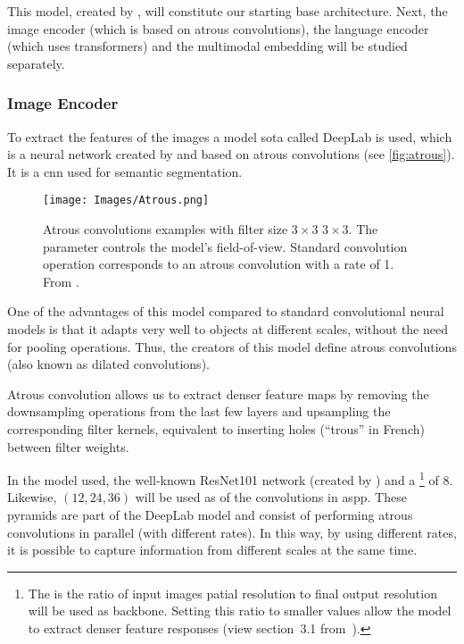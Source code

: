 This model, created by , will constitute our starting
base architecture. Next, the image encoder (which is based on atrous
convolutions), the language encoder (which uses transformers) and the
multimodal embedding will be studied separately.

\subsubsection{Image Encoder}
To extract the features of the images a model \gls{sota} called DeepLab is
used, which is a neural network created by  and based on
atrous convolutions (see \vref{fig:atrous}). It is a \gls{cnn} used for
semantic segmentation.

\begin{figure}[ht]
  \centering
  \texttt{[image: Images/Atrous.png]}
  \caption[Atrous convolutions examples]{Atrous convolutions examples with
    filter size \(3 \times 3\) \(3 \times 3\). The  parameter
    controls the model's field-of-view. Standard convolution operation
    corresponds to an atrous convolution with a rate of 1. From
    .}\label{fig:atrous}
\end{figure}

One of the advantages of this model compared to standard convolutional neural
models is that it adapts very well to objects at different scales, without the
need for pooling operations. Thus, the creators of this model define atrous
convolutions (also known as dilated convolutions).

\begin{quoteBox}
  Atrous convolution allows us to extract denser feature maps by removing the
  downsampling operations from the last few layers and upsampling the
  corresponding filter kernels, equivalent to inserting holes (``trous'' in
  French) between filter weights.
  \tcblower{}
\end{quoteBox}

In the model used, the well-known ResNet101 network (created by
) and a \footnote{The
   is the ratio of input images patial resolution to final
  output resolution will be used as backbone. Setting this ratio to smaller
  values allow the model to extract denser feature responses (view section~3.1
  from~\cite{chen17:rethin}).} of 8. Likewise, \((12, 24, 36)\) will be used as
 of the convolutions in \gls{aspp}. These pyramids are part of the
DeepLab model and consist of performing atrous convolutions in parallel (with
different rates). In this way, by using different rates, it is possible to
capture information from different scales at the same time.

